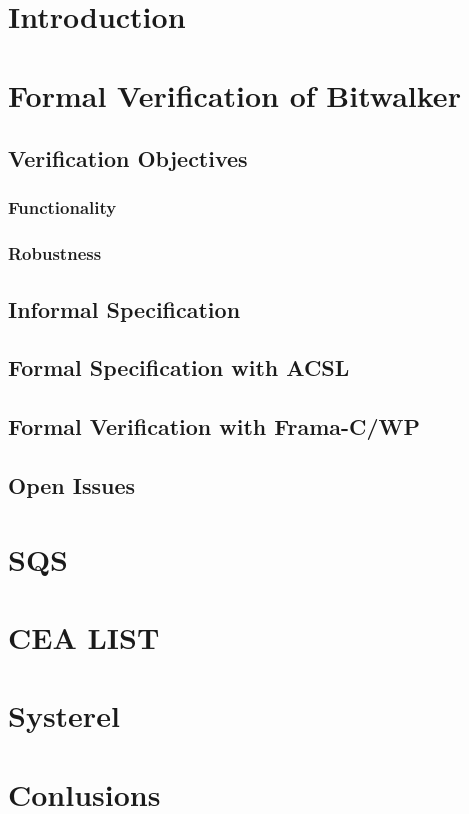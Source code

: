 \documentclass{template/openetcs_article}
\begin{document}

\section{Introduction}

\section{Formal Verification of Bitwalker}
\subsection{Verification Objectives}
\subsubsection{Functionality}
\subsubsection{Robustness}

\subsection{Informal Specification}
\subsection{Formal Specification with ACSL}
\subsection{Formal Verification with Frama-C/WP}
\subsection{Open Issues}

\section{SQS}

\section{CEA LIST}

\section{Systerel}

\section{Conlusions}

\nocite{*}
\end{document}
